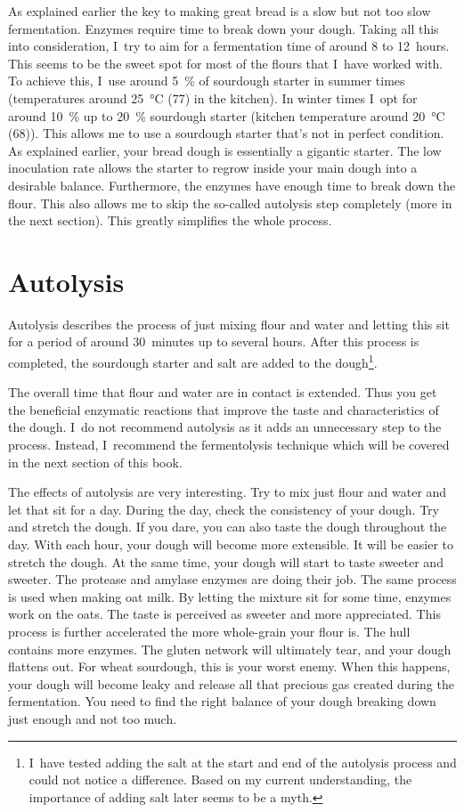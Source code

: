 As explained earlier the key to making great bread is a slow but not too slow
fermentation. Enzymes require time to break down your dough. Taking all this
into consideration, I~try to aim for a fermentation time of around 8 to 12~hours. This seems to be
the sweet spot for most of the flours that I~have worked with. To achieve this,
I~use around \qty{5}{\percent} of sourdough starter in summer times
(temperatures around \qty{25}{\degreeCelsius} (\qty{77}{\degF}) in the
kitchen). In winter times I~opt for around \qty{10}{\percent} up to
\qty{20}{\percent} sourdough starter (kitchen temperature around
\qty{20}{\degreeCelsius} (\qty{68}{\degF})). This
allows me to use a sourdough starter that's not in perfect condition. As
explained earlier, your
bread dough is essentially a gigantic starter. The low inoculation rate allows
the starter to regrow inside your main dough into a desirable balance.
Furthermore, the enzymes have enough time to break down the flour. This also
allows me to skip the so-called autolysis step completely (more in the next section).
This greatly simplifies the whole process.

\section{Autolysis}%
\label{sec:autolysis}

Autolysis describes the process of just mixing flour and water and letting
this sit for a period of around 30~minutes up to several hours. After this
process is completed, the sourdough starter and salt are added to the
dough\footnote{I~have tested adding the salt at the start and end of the
autolysis process and could not notice a difference. Based on my current
understanding, the importance of adding salt later seems to be a myth.}.

The overall time that flour and water are in contact is extended. Thus you get the
beneficial enzymatic reactions that improve the taste and characteristics of the
dough. I~do not recommend autolysis as it adds an unnecessary step to the
process. Instead, I~recommend the fermentolysis technique which will be covered in the
next section of this book.

The effects of autolysis are very interesting. Try to mix just flour and
water and let that sit for a day. During the day, check the consistency of
your dough. Try and stretch the dough. If you dare, you can also taste the
dough throughout the day. With each hour, your dough will become
more extensible. It will be easier to stretch the dough. At the same time, your
dough will start to taste sweeter and sweeter. The protease and amylase enzymes
are doing their job. The same process is used when making oat milk. By letting
the mixture sit for some time, enzymes work on the oats. The taste is perceived as
sweeter and more appreciated. This process is further accelerated the more
whole-grain your flour is. The hull contains more enzymes. The gluten network
will ultimately tear, and your dough flattens out. For wheat sourdough, this is
your worst enemy. When this happens, your dough will become leaky and release
all that precious gas created during the fermentation. You need to find the
right balance of your dough breaking down just enough and not too much.

